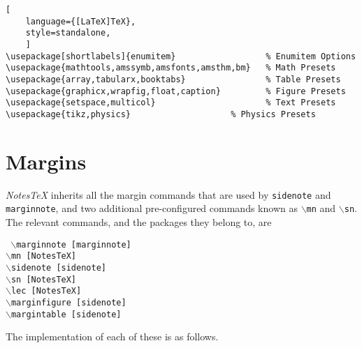 \documentclass[10pt]{article}
\begin{document}
\begin{lstlisting}[
	language={[LaTeX]TeX},
	style=standalone,
	]
\usepackage[shortlabels]{enumitem}                  % Enumitem Options
\usepackage{mathtools,amssymb,amsfonts,amsthm,bm}   % Math Presets
\usepackage{array,tabularx,booktabs}                % Table Presets
\usepackage{graphicx,wrapfig,float,caption}         % Figure Presets
\usepackage{setspace,multicol}                      % Text Presets
\usepackage{tikz,physics}                    % Physics Presets
\end{lstlisting}


	\section{Margins}\label{Sec:Margins}%
	\textit{NotesTeX} inherits all the margin commands that are used by \texttt{sidenote} and \texttt{marginnote}, and two additional pre-configured commands known as \texttt{$\backslash$mn} and \texttt{$\backslash$sn}. The relevant commands, and the packages they belong to, are
	\begin{center}
		\begin{multicols}{2}
		\noindent\texttt{
		$\backslash$marginnote~[marginnote]\\
		$\backslash$mn~[NotesTeX]\\
		$\backslash$sidenote~[sidenote]\\
		$\backslash$sn~[NotesTeX]\\
		$\backslash$lec~[NotesTeX]\\
		$\backslash$marginfigure~[sidenote]\\
		$\backslash$margintable~[sidenote]\\
		}
	\end{multicols}
	\end{center}
	The implementation of each of these is as follows.
\end{document}
